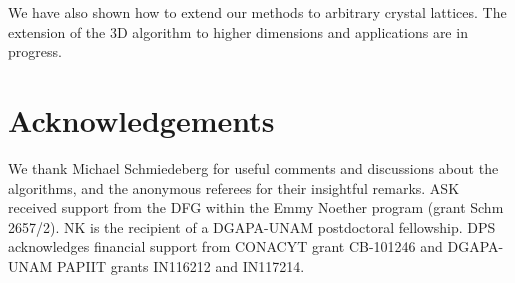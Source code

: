 \documentclass[pre,amsmath,amssymb, twocolumn, showpacs]{revtex4-1}
\begin{document}
We have also shown how to extend our methods to arbitrary crystal lattices. 
The extension of the 3D algorithm to higher dimensions and applications are  in progress. 

\section{Acknowledgements}  
We thank Michael Schmiedeberg for useful comments and discussions about the algorithms, and the anonymous referees for their insightful remarks. 
ASK received support from the DFG within the Emmy Noether program (grant Schm 2657/2). 
NK is the recipient of a DGAPA-UNAM postdoctoral fellowship. 
DPS acknowledges financial support from CONACYT grant CB-101246 and DGAPA-UNAM PAPIIT grants IN116212 and IN117214. 

\vspace*{10pt}


%


\end{document}
